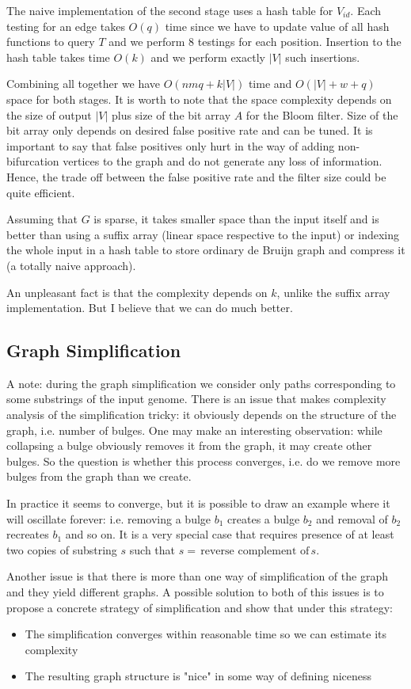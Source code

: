 \documentclass[a4paper, 12pt]{scrartcl}
\begin{document}
The naive implementation of the second stage uses a hash table for $V_{id}$.
Each testing for an edge takes $O(q)$ time since we have to update value of all hash functions to query $T$ and we perform 8 testings for each position.
Insertion to the hash table takes time $O(k)$ and we perform exactly $|V|$ such insertions.

Combining all together we have $O(nmq + k|V|)$ time and $O(|V| + w + q)$ space for both stages. 
It is worth to note that the space complexity depends on the size of output $|V|$ plus size of the bit array $A$ for the Bloom filter.
Size of the bit array only depends on desired false positive rate and can be tuned.
It is important to say that false positives only hurt in the way of adding non-bifurcation vertices to the graph and do not generate any loss of information.
Hence, the trade off between the false positive rate and the filter size could be quite efficient.

Assuming that $G$ is sparse, it takes smaller space than the input itself and is better than using a suffix array (linear space respective to the input) or indexing the whole input in a hash table to store ordinary de Bruijn graph and compress it (a totally naive approach).

An unpleasant fact is that the complexity depends on $k$, unlike the suffix array implementation.
But I believe that we can do much better.
\pagebreak
\subsection{Graph Simplification}
A note: during the graph simplification we consider only paths corresponding to some substrings of the input genome.
There is an issue that makes complexity analysis of the simplification tricky: it obviously depends on the structure of the graph, i.e. number of bulges.
One may make an interesting observation: while collapsing a bulge obviously removes it from the graph, it may create other bulges.
So the question is whether this process converges, i.e. do we remove more bulges from the graph than we create.

In practice it seems to converge, but it is possible to draw an example where it will oscillate forever: i.e. removing a bulge $b_1$ creates a bulge $b_2$ and removal of $b_2$ recreates $b_1$ and so on.
It is a very special case that requires presence of at least two copies of substring $s$ such that $s = \, \text{reverse complement of} \, s$.

Another issue is that there is more than one way of simplification of the graph and they yield different graphs.
A possible solution to both of this issues is to propose a concrete strategy of simplification and show that under this strategy:
\begin{itemize}
\item The simplification converges within reasonable time so we can estimate its complexity
\item The resulting graph structure is "nice" in some way of defining niceness

\end{itemize}

\end{document}
